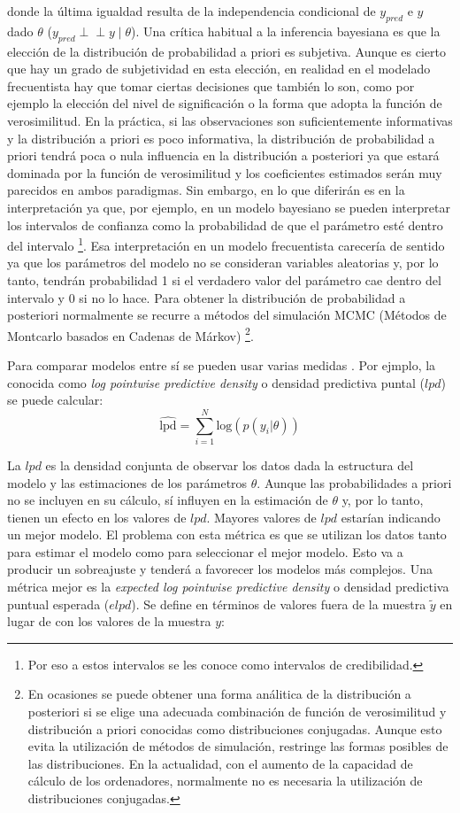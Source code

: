 \documentclass[
  12pt,
  a4paper,
  extrafontsizes,
  onecolumn,
  openright,
  table]{memoir}
\begin{document}
donde la última igualdad resulta de la independencia condicional de
\(y_{pred}\) e \(y\) dado \(\theta\)
(\(y_{pred} \perp\!\!\!\perp y \mid \theta\)). Una crítica habitual a la
inferencia bayesiana es que la elección de la distribución de
probabilidad a priori es subjetiva. Aunque es cierto que hay un grado de
subjetividad en esta elección, en realidad en el modelado frecuentista
hay que tomar ciertas decisiones que también lo son, como por ejemplo la
elección del nivel de significación o la forma que adopta la función de
verosimilitud. En la práctica, si las observaciones son suficientemente
informativas y la distribución a priori es poco informativa, la
distribución de probabilidad a priori tendrá poca o nula influencia en
la distribución a posteriori ya que estará dominada por la función de
verosimilitud y los coeficientes estimados serán muy parecidos en ambos
paradigmas. Sin embargo, en lo que diferirán es en la interpretación ya
que, por ejemplo, en un modelo bayesiano se pueden interpretar los
intervalos de confianza como la probabilidad de que el parámetro esté
dentro del intervalo \footnote{Por eso a estos intervalos se les conoce
  como intervalos de credibilidad.}. Esa interpretación en un modelo
frecuentista carecería de sentido ya que los parámetros del modelo no se
consideran variables aleatorias y, por lo tanto, tendrán probabilidad 1
si el verdadero valor del parámetro cae dentro del intervalo y 0 si no
lo hace. Para obtener la distribución de probabilidad a posteriori
normalmente se recurre a métodos del simulación MCMC (Métodos de
Montcarlo basados en Cadenas de Márkov) \footnote{En ocasiones se puede
  obtener una forma análitica de la distribución a posteriori si se
  elige una adecuada combinación de función de verosimilitud y
  distribución a priori conocidas como distribuciones conjugadas. Aunque
  esto evita la utilización de métodos de simulación, restringe las
  formas posibles de las distribuciones. En la actualidad, con el
  aumento de la capacidad de cálculo de los ordenadores, normalmente no
  es necesaria la utilización de distribuciones conjugadas.}.

Para comparar modelos entre sí se pueden usar varias medidas
\autocite[ver][]{barreda2023}. Por ejmplo, la conocida como \emph{log
pointwise predictive density} o densidad predictiva puntal (\(lpd\)) se
puede calcular: \[
\widehat{\mathrm{lpd}} = \sum_{i=1}^{N} \mathrm{log} (p(y_{i} | \theta))
\]

La \(lpd\) es la densidad conjunta de observar los datos dada la
estructura del modelo y las estimaciones de los parámetros \(\theta\).
Aunque las probabilidades a priori no se incluyen en su cálculo, sí
influyen en la estimación de \(\theta\) y, por lo tanto, tienen un
efecto en los valores de \(lpd\). Mayores valores de \(lpd\) estarían
indicando un mejor modelo. El problema con esta métrica es que se
utilizan los datos tanto para estimar el modelo como para seleccionar el
mejor modelo. Esto va a producir un sobreajuste y tenderá a favorecer
los modelos más complejos. Una métrica mejor es la \emph{expected log
pointwise predictive density} o densidad predictiva puntual esperada
(\(elpd\)). Se define en términos de valores fuera de la muestra
\(\tilde{y}\) en lugar de con los valores de la muestra \(y\):
\end{document}
